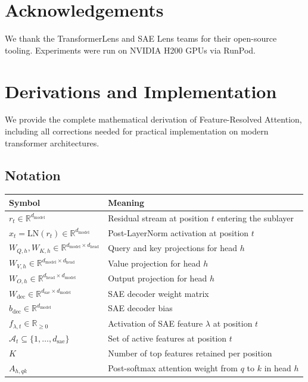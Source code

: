 \documentclass{article}
\theoremstyle{plain}
\theoremstyle{definition}
\theoremstyle{remark}
\newcommand{\Wdec}{W_{\mathrm{dec}}}
\newcommand{\dmodel}{d_{\mathrm{model}}}
\newcommand{\dhead}{d_{\mathrm{head}}}
\newcommand{\dsae}{d_{\mathrm{sae}}}
\newcommand{\RR}{\mathbb{R}}
\begin{document}
\section*{Acknowledgements}

We thank the TransformerLens and SAE Lens teams for their open-source tooling. Experiments were run on NVIDIA H200 GPUs via RunPod.






\newpage
\appendix
\onecolumn

\section{Derivations and Implementation}
\label{app:derivations}

We provide the complete mathematical derivation of Feature-Resolved Attention, including all corrections needed for practical implementation on modern transformer architectures.

\subsection{Notation}

\begin{table}[h]
\centering
\begin{tabular}{ll}
\toprule
Symbol & Meaning \\
\midrule
$r_t \in \RR^{\dmodel}$ & Residual stream at position $t$ entering the sublayer \\
$x_t = \mathrm{LN}(r_t) \in \RR^{\dmodel}$ & Post-LayerNorm activation at position $t$ \\
$W_{Q,h}, W_{K,h} \in \RR^{\dmodel \times \dhead}$ & Query and key projections for head $h$ \\
$W_{V,h} \in \RR^{\dmodel \times \dhead}$ & Value projection for head $h$ \\
$W_{O,h} \in \RR^{\dhead \times \dmodel}$ & Output projection for head $h$ \\
$\Wdec \in \RR^{\dsae \times \dmodel}$ & SAE decoder weight matrix \\
$b_{\mathrm{dec}} \in \RR^{\dmodel}$ & SAE decoder bias \\
$f_{\lambda,t} \in \RR_{\geq 0}$ & Activation of SAE feature $\lambda$ at position $t$ \\
$\mathcal{A}_t \subseteq \{1, \ldots, \dsae\}$ & Set of active features at position $t$ \\
$K$ & Number of top features retained per position \\
$A_{h,qk}$ & Post-softmax attention weight from $q$ to $k$ in head $h$ \\
\bottomrule
\end{tabular}
\end{table}
\end{document}
